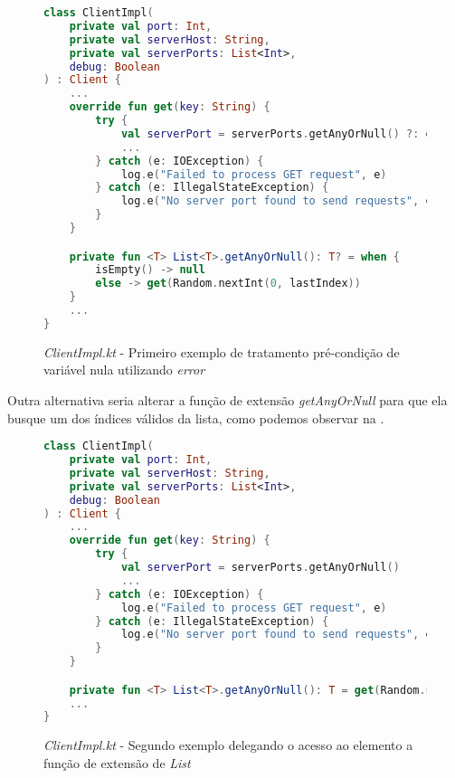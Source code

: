 \begin{figure}[H]
    \centering
    \begin{lstlisting}[language=Kotlin]
class ClientImpl(
    private val port: Int,
    private val serverHost: String,
    private val serverPorts: List<Int>,
    debug: Boolean
) : Client {
    ...
    override fun get(key: String) {
        try {
            val serverPort = serverPorts.getAnyOrNull() ?: error("No server port found to send request")
            ...
        } catch (e: IOException) {
            log.e("Failed to process GET request", e)
        } catch (e: IllegalStateException) {
            log.e("No server port found to send requests", e)
        }
    }

    private fun <T> List<T>.getAnyOrNull(): T? = when {
        isEmpty() -> null
        else -> get(Random.nextInt(0, lastIndex))
    }
    ...
}
    \end{lstlisting}
    \caption{\textit{ClientImpl.kt} - Primeiro exemplo de tratamento pré-condição de variável nula utilizando \textit{error}}
    \label{fig:detekt_unsafe_null_call_on_nullable_after_first_example}
\end{figure}

Outra alternativa seria alterar a função de extensão \textit{getAnyOrNull} para que ela busque um dos índices válidos da lista, como podemos observar na .

\begin{figure}[H]
    \centering
    \begin{lstlisting}[language=Kotlin]
class ClientImpl(
    private val port: Int,
    private val serverHost: String,
    private val serverPorts: List<Int>,
    debug: Boolean
) : Client {
    ...
    override fun get(key: String) {
        try {
            val serverPort = serverPorts.getAnyOrNull()
            ...
        } catch (e: IOException) {
            log.e("Failed to process GET request", e)
        } catch (e: IllegalStateException) {
            log.e("No server port found to send requests", e)
        }
    }

    private fun <T> List<T>.getAnyOrNull(): T = get(Random.nextInt(lastIndex))
    ...
}
    \end{lstlisting}
    \caption{\textit{ClientImpl.kt} - Segundo exemplo delegando o acesso ao elemento a função de extensão de \textit{List}}
    \label{fig:detekt_unsafe_null_call_on_nullable_after_second_example}
\end{figure}

